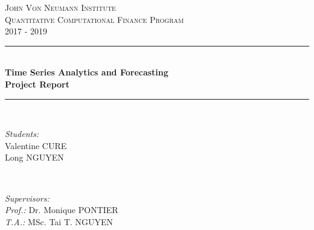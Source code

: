 \documentclass[a4paper]{article}
\begin{document}
\begin{titlepage}

\newcommand{\HRule}{\rule{\linewidth}{0.5mm}} %

\center %
 

\textsc{\LARGE John Von Neumann Institute}\\[1.5cm] %
\textsc{\Large Quantitative Computational Finance Program}\\[0.5cm] %
\textsc{\large 2017 - 2019}\\[0.5cm] %


\HRule \\[0.4cm]
{ \huge \bfseries Time Series Analytics and Forecasting}\\[0.5cm] 
{ \huge \bfseries Project Report}\\[0.4cm] 
\HRule \\[1.5cm]
 

\begin{minipage}{0.4\textwidth}
\begin{flushleft} \large
\emph{Students:}\\
Valentine \textsc{CURE}\\ %
Long \textsc{NGUYEN}
\end{flushleft}
\end{minipage}
~
\begin{minipage}{0.4\textwidth}
\begin{flushright} \large
\emph{Supervisors:}\\
\emph{Prof.:} Dr. Monique \textsc{PONTIER}\\ %
\emph{T.A.:} MSc. Tai T. \textsc{NGUYEN}
\end{flushright}
\end{minipage}\\[3cm]


\end{titlepage}
\end{document}
